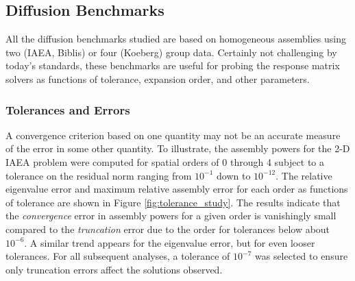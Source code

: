 \subsection{Diffusion Benchmarks}

All the diffusion benchmarks studied are based on homogeneous
assemblies using two (IAEA, Biblis) or four (Koeberg) group 
data.  Certainly not challenging by today's standards, these 
benchmarks are useful for probing the response matrix solvers
as functions of tolerance, expansion order, and other parameters.


\subsubsection{Tolerances and Errors}

A convergence criterion based on 
one quantity may not be an accurate measure of the error in some 
other quantity.  To illustrate, the assembly powers for the 2-D IAEA 
problem were computed for spatial orders of 0 through 4 subject to 
a tolerance on the residual norm ranging from $10^{-1}$ down to $10^{-12}$.
The relative eigenvalue error  and maximum relative assembly error for each
order as functions of 
tolerance are shown in Figure \ref{fig:tolerance_study}.
The results indicate that the {\it convergence} error in assembly powers 
for a  given order is vanishingly small compared to 
the {\it truncation} error due to the order for tolerances
below about $10^{-6}$.  A similar trend appears for the eigenvalue 
error, but for even looser tolerances.  For all subsequent  
analyses, a tolerance of $10^{-7}$ was selected to ensure only 
truncation errors affect the solutions observed.

